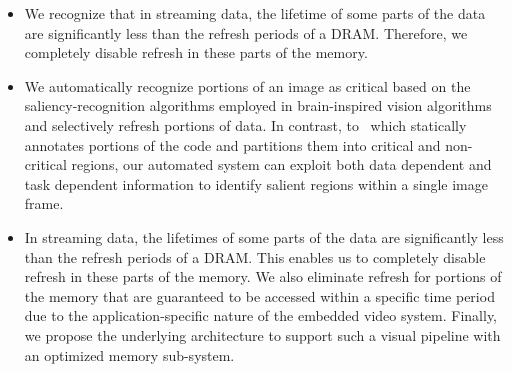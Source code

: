 \begin{itemize}[leftmargin=*]
\item We recognize that in streaming data, the lifetime of some parts of the data are significantly less than the refresh periods of a DRAM. Therefore, we completely disable refresh in these parts of the memory. 
\item We automatically recognize portions of an image as critical based on the saliency-recognition algorithms employed in brain-inspired vision algorithms and selectively refresh portions of data.
In contrast, to~\cite{Liu2011} which statically annotates portions of the code and partitions them into critical and non-critical regions, our automated system can exploit both data dependent and task dependent information to identify salient regions within a single image frame. 
\item In streaming data, the lifetimes of some parts of the data are significantly less than the refresh periods of a DRAM. This enables us to completely disable refresh in these parts of the memory. 
We also eliminate refresh for portions of the memory that are guaranteed to be accessed within a specific time period due to the application-specific nature of the embedded video system.
Finally, we propose the underlying architecture to support such a visual pipeline with an optimized memory sub-system.
\end{itemize}

